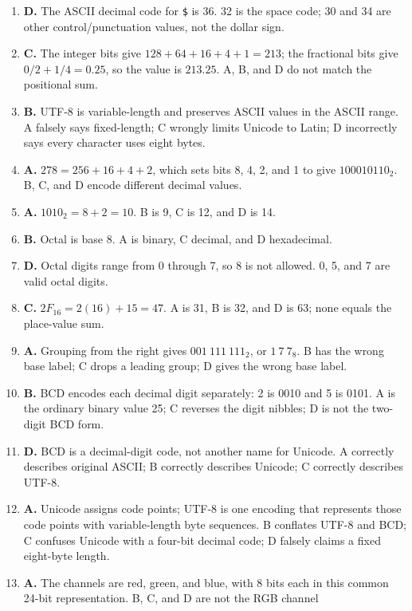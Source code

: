 \begin{enumerate}[label=\textbf{Q\arabic*.}, leftmargin=*]
\item \textbf{D.} The ASCII decimal code for \texttt{\$} is 36. 32 is the
  space code; 30 and 34 are other control/punctuation values, not the dollar
  sign.
\item \textbf{C.} The integer bits give $128+64+16+4+1=213$; the fractional
  bits give $0/2+1/4=0.25$, so the value is $213.25$. A, B, and D do not
  match the positional sum.
\item \textbf{B.} UTF-8 is variable-length and preserves ASCII values in the
  ASCII range. A falsely says fixed-length; C wrongly limits Unicode to
  Latin; D incorrectly says every character uses eight bytes.
\item \textbf{A.} $278=256+16+4+2$, which sets bits 8, 4, 2, and 1 to give
  $100010110_2$. B, C, and D encode different decimal values.
\item \textbf{A.} $1010_2=8+2=10$. B is 9, C is 12, and D is 14.
\item \textbf{B.} Octal is base 8. A is binary, C decimal, and D hexadecimal.
\item \textbf{D.} Octal digits range from 0 through 7, so 8 is not allowed.
  0, 5, and 7 are valid octal digits.
\item \textbf{C.} $2F_{16}=2(16)+15=47$. A is 31, B is 32, and D is 63;
  none equals the place-value sum.
\item \textbf{A.} Grouping from the right gives $001\ 111\ 111_2$, or
  $1\ 7\ 7_8$. B has the wrong base label; C drops a leading group; D gives
  the wrong base label.
\item \textbf{B.} BCD encodes each decimal digit separately: 2 is 0010 and
  5 is 0101. A is the ordinary binary value 25; C reverses the digit
  nibbles; D is not the two-digit BCD form.
\item \textbf{D.} BCD is a decimal-digit code, not another name for Unicode.
  A correctly describes original ASCII; B correctly describes Unicode; C
  correctly describes UTF-8.
\item \textbf{A.} Unicode assigns code points; UTF-8 is one encoding that
  represents those code points with variable-length byte sequences. B
  conflates UTF-8 and BCD; C confuses Unicode with a four-bit decimal code;
  D falsely claims a fixed eight-byte length.
\item \textbf{A.} The channels are red, green, and blue, with 8 bits each in
  this common 24-bit representation. B, C, and D are not the RGB channel

\end{enumerate}
